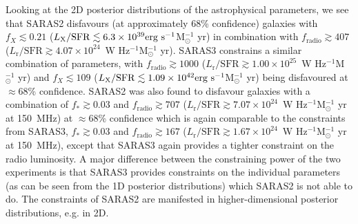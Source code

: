 Looking at the 2D posterior distributions of the astrophysical parameters, we see that SARAS2  disfavours (at approximately 68\% confidence) galaxies with $f_X \lesssim 0.21$ ($L_\mathrm{X}/\mathrm{SFR} \lesssim 6.3\times10^{39}\textnormal{erg~s}^{-1}$M$_\odot^{-1}$ yr) in combination with $f_\mathrm{radio} \gtrsim 407$ ($L_\mathrm{r}/\mathrm{SFR} \gtrsim 4.07\times10^{24}$~W Hz$^{-1}$M$_\odot^{-1}$ yr). SARAS3  constrains a similar combination of parameters, with $f_\mathrm{radio} \gtrsim 1000$ ($L_\mathrm{r}/\mathrm{SFR} \gtrsim 1.00\times10^{25}$~W Hz$^{-1}$M$_\odot^{-1}$ yr) and $f_X \lesssim 109$ ($L_\mathrm{X}/\mathrm{SFR} \lesssim 1.09\times10^{42}\textnormal{erg~s}^{-1}$M$_\odot^{-1}$ yr) being disfavoured at $\approx68$\% confidence. SARAS2 was also found to disfavour galaxies with a combination of $f_* \gtrsim 0.03$ and  $f_\mathrm{radio} \gtrsim 707$ ($L_\mathrm{r}/\mathrm{SFR} \gtrsim 7.07\times10^{24}$~W Hz$^{-1}$M$_\odot^{-1}$ yr at 150~MHz) at $\approx68$\% confidence which is again comparable to the constraints from SARAS3, $f_* \gtrsim 0.03$ and $f_\mathrm{radio} \gtrsim 167$ ($L_\mathrm{r}/\mathrm{SFR} \gtrsim 1.67\times10^{24}$~W Hz$^{-1}$M$_\odot^{-1}$ yr at 150~MHz), except that SARAS3 again provides a tighter constraint on the radio luminosity. A major difference between the constraining power of the two experiments is that SARAS3 provides constraints on the individual parameters (as can be seen from the 1D posterior distributions) which SARAS2 is not able to do. The constraints of SARAS2 are manifested in higher-dimensional posterior distributions, e.g. in 2D.

